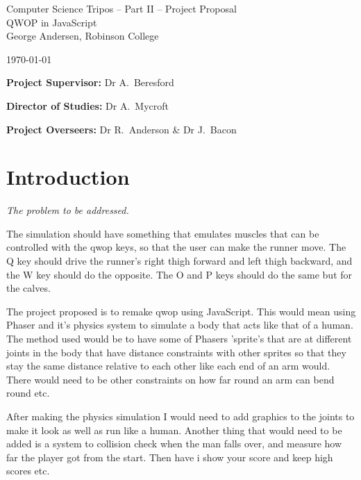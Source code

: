 \documentclass[12pt,a4paper,twoside]{article}
\begin{document}
\begin{center}
\Large
Computer Science Tripos -- Part II -- Project Proposal\\[4mm]
\LARGE
QWOP in JavaScript \\[4mm]

\large
George Andersen, Robinson College

\today

\end{center}

\vspace{5mm}

\textbf{Project Supervisor:} Dr A.~Beresford

\textbf{Director of Studies:} Dr A.~Mycroft

\textbf{Project Overseers:} Dr R.~Anderson \& Dr J.~Bacon


\section*{Introduction}

\emph{The problem to be addressed.}
 
 The simulation should have something that emulates muscles that can be controlled with the qwop keys, so that the user can make the runner move. The Q key should drive the runner's right thigh forward and left thigh backward, and the W key should do the opposite. The O and P keys should do the same but for the calves.


 The project proposed is to remake qwop using JavaScript. This would mean using Phaser and it's physics system to simulate a body that acts like that of a human. The method used would be to have some of Phasers 'sprite's that are at different joints in the body that have distance constraints with other sprites so that they stay the same distance relative to each other like each end of an arm would. There would need to be other constraints on how far round an arm can bend round etc.


 After making the physics simulation I would need to add graphics to the joints to make it look as well as run like a human. Another thing that would need to be added is a system to collision check when the man falls over, and measure how far the player got from the start. Then have i  show your score and keep high scores etc.
 
\end{document}
